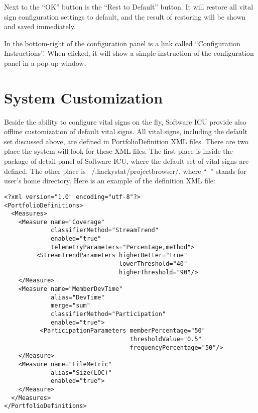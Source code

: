 Next to the ``OK'' button is the ``Rest to Default'' button. It will restore all vital sign configuration settings to default, and the result of restoring will be shown and saved immediately. 

In the bottom-right of the configuration panel is a link called ``Configuration Instructions''. When clicked, it will show a simple instruction of the configuration panel in a pop-up window.


\section{System Customization}
\label{SystemCustomization}

Beside the ability to configure vital signs on the fly, Software ICU provide also offline customization of default vital signs. All vital signs, including the default set discussed above, are defined in PortfolioDefinition XML files. There are two place the system will look for these XML files. The first place is inside the package of detail panel of Software ICU, where the default set of vital signs are defined. The other place is ~/.hackystat/projectbrowser/, where ``~'' stands for user's home directory. Here is an example of the definition XML file:

\begin{verbatim}
<?xml version="1.0" encoding="utf-8"?>
<PortfolioDefinitions>
  <Measures>
    <Measure name="Coverage" 
             classifierMethod="StreamTrend" 
             enabled="true"
             telemetryParameters="Percentage,method">
         <StreamTrendParameters higherBetter="true" 
                                lowerThreshold="40" 
                                higherThreshold="90"/>
    </Measure>
    <Measure name="MemberDevTime" 
             alias="DevTime" 
             merge="sum" 
             classifierMethod="Participation" 
             enabled="true">
          <ParticipationParameters memberPercentage="50" 
                                   thresholdValue="0.5" 
                                   frequencyPercentage="50"/>
    </Measure>
    <Measure name="FileMetric" 
             alias="Size(LOC)" 
             enabled="true">
    </Measure>
  </Measures>
</PortfolioDefinitions>
\end{verbatim}

